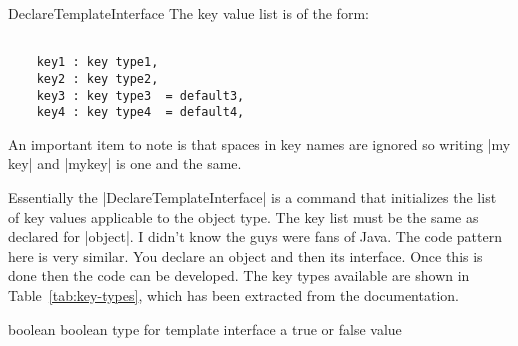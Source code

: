 \begin{docCommand} {DeclareTemplateInterface} { }
The key value list is of the form:
\begin{verbatim}

    key1 : key type1,
    key2 : key type2,
    key3 : key type3  = default3,
    key4 : key type4  = default4,
\end{verbatim}

An important item to note is that spaces in key names are ignored so writing |my key| and |mykey| is one and the same. 

Essentially the |DeclareTemplateInterface| is a command that initializes the list of key values applicable to the object type. The key list must be the same as declared for |object|. I didn’t know the \latex guys were fans of Java. The code pattern here is very similar. You declare an object and then its interface. Once this is done then the code can be developed. The key types available are shown in Table~\ref{tab:key-types}, which has been extracted from the documentation.

\end{docCommand}

\begin{docKey}{boolean} { boolean type for template interface}{}
a true or false value
\end{docKey}

